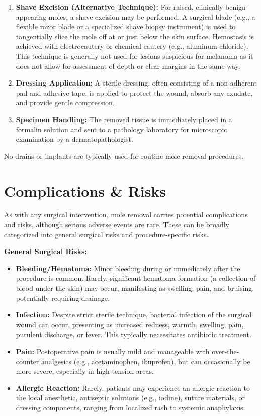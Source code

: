 \begin{enumerate}
  \item \textbf{Shave Excision (Alternative Technique):} For raised, clinically benign-appearing moles, a shave excision may be performed. A surgical blade (e.g., a flexible razor blade or a specialized shave biopsy instrument) is used to tangentially slice the mole off at or just below the skin surface. Hemostasis is achieved with electrocautery or chemical cautery (e.g., aluminum chloride). This technique is generally not used for lesions suspicious for melanoma as it does not allow for assessment of depth or clear margins in the same way.
  
  \item \textbf{Dressing Application:} A sterile dressing, often consisting of a non-adherent pad and adhesive tape, is applied to protect the wound, absorb any exudate, and provide gentle compression.
  
  \item \textbf{Specimen Handling:} The removed tissue is immediately placed in a formalin solution and sent to a pathology laboratory for microscopic examination by a dermatopathologist.
\end{enumerate}

No drains or implants are typically used for routine mole removal procedures.

\section*{Complications \& Risks}
As with any surgical intervention, mole removal carries potential complications and risks, although serious adverse events are rare. These can be broadly categorized into general surgical risks and procedure-specific risks.

\textbf{General Surgical Risks:}

\begin{itemize}
  \item \textbf{Bleeding/Hematoma:} Minor bleeding during or immediately after the procedure is common. Rarely, significant hematoma formation (a collection of blood under the skin) may occur, manifesting as swelling, pain, and bruising, potentially requiring drainage.
  
  \item \textbf{Infection:} Despite strict sterile technique, bacterial infection of the surgical wound can occur, presenting as increased redness, warmth, swelling, pain, purulent discharge, or fever. This typically necessitates antibiotic treatment.
  
  \item \textbf{Pain:} Postoperative pain is usually mild and manageable with over-the-counter analgesics (e.g., acetaminophen, ibuprofen), but can occasionally be more severe, especially in high-tension areas.
  
  \item \textbf{Allergic Reaction:} Rarely, patients may experience an allergic reaction to the local anesthetic, antiseptic solutions (e.g., iodine), suture materials, or dressing components, ranging from localized rash to systemic anaphylaxis.
\end{itemize}

